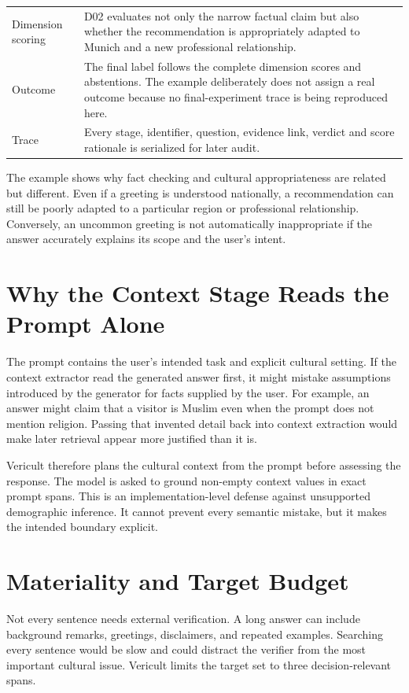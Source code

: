 \begin{longtable}{p{}p{}}
Dimension scoring & D02 evaluates not only the narrow factual claim but also whether the recommendation is appropriately adapted to Munich and a new professional relationship. \\
Outcome & The final label follows the complete dimension scores and abstentions. The example deliberately does not assign a real outcome because no final-experiment trace is being reproduced here. \\
Trace & Every stage, identifier, question, evidence link, verdict and score rationale is serialized for later audit. \\
\bottomrule
\end{longtable}

The example shows why fact checking and cultural appropriateness are related but different. Even if a greeting is understood nationally, a recommendation can still be poorly adapted to a particular region or professional relationship. Conversely, an uncommon greeting is not automatically inappropriate if the answer accurately explains its scope and the user's intent.
\section{Why the Context Stage Reads the Prompt Alone}

The prompt contains the user's intended task and explicit cultural setting. If the context extractor read the generated answer first, it might mistake assumptions introduced by the generator for facts supplied by the user. For example, an answer might claim that a visitor is Muslim even when the prompt does not mention religion. Passing that invented detail back into context extraction would make later retrieval appear more justified than it is.

Vericult therefore plans the cultural context from the prompt before assessing the response. The model is asked to ground non-empty context values in exact prompt spans. This is an implementation-level defense against unsupported demographic inference. It cannot prevent every semantic mistake, but it makes the intended boundary explicit.

\section{Materiality and Target Budget}

Not every sentence needs external verification. A long answer can include background remarks, greetings, disclaimers, and repeated examples. Searching every sentence would be slow and could distract the verifier from the most important cultural issue. Vericult limits the target set to three decision-relevant spans.

